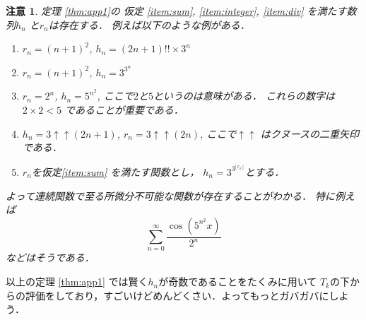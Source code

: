 \documentclass[leqno, a4paper, 12pt]{jsarticle}
\newtheorem*{rmk}{注意}
\newcommand{\knus}{\mathbin{\uparrow\uparrow}}
\begin{document}
\begin{rmk}
定理
\ref{thm:app1}の
仮定
\ref{item:sum}, 
\ref{item:integer}, 
\ref{item:div}
を満たす数列$h_{n}$
と$r_{n}$は存在する．
例えば以下のような例がある．
\begin{enumerate}[label=\textup{(\arabic*)}]
\item 
$r_{n}=(n+1)^{2}$, 
$h_{n}=(2n+1)!!\times 3^{n}$
\item 
$r_{n}=(n+1)^{2}$, 
$h_{n}=3^{3^{n}}$
\item 
$r_{n}=2^{n}$, 
$h_{n}=5^{n^{2}}$, 
ここで$2$と$5$というのは意味がある．
これらの数字は$2\times 2<5$
であることが重要である．
\item 
$h_{n}=3\knus (2n+1)$, 
$r_{n}=3\knus (2n)$, 
ここで$\knus$
はクヌースの二重矢印である．
\item 
$r_{n}$を仮定\ref{item:sum}
を満たす関数とし，
$h_{n}=3^{3^{\lfloor r_{n}\rfloor}}$とする．
\end{enumerate}
よって連続関数で至る所微分不可能な関数が存在することがわかる．
特に例えば
\[
\sum_{n=0}^{\infty}\frac{\cos\left(5^{n^{2}}x\right)}{2^{n}}
\]
などはそうである．
\end{rmk}

以上の定理
\ref{thm:app1}
では賢く$h_{n}$が奇数であることをたくみに用いて
$T_{k}$の下からの評価をしており，すごいけどめんどくさい．よってもっとガバガバにしよう．
\end{document}
